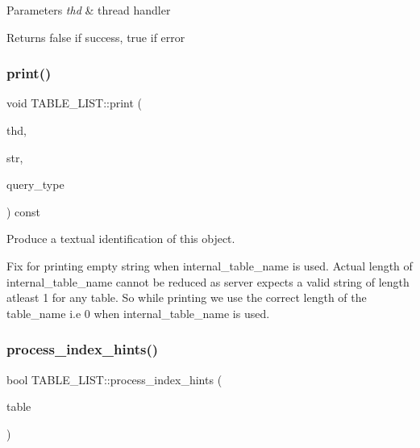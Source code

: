 \begin{DoxyParams}{Parameters}
{\em thd} & thread handler\\
\hline
\end{DoxyParams}
\begin{DoxyReturn}{Returns}
false if success, true if error 
\end{DoxyReturn}
\mbox{\label{structTABLE__LIST_a150941693e3ab1b041c7fb3dd98eb8db}} 
\subsubsection{\texorpdfstring{print()}{print()}}
{\footnotesize\ttfamily void T\+A\+B\+L\+E\+\_\+\+L\+I\+S\+T\+::print (\begin{DoxyParamCaption}\item[{T\+HD $\ast$}]{thd,  }\item[{String $\ast$}]{str,  }\item[{enum\+\_\+query\+\_\+type}]{query\+\_\+type }\end{DoxyParamCaption}) const}



Produce a textual identification of this object. 

Fix for printing empty string when internal\+\_\+table\+\_\+name is used. Actual length of internal\+\_\+table\+\_\+name cannot be reduced as server expects a valid string of length atleast 1 for any table. So while printing we use the correct length of the table\+\_\+name i.\+e 0 when internal\+\_\+table\+\_\+name is used.\mbox{\label{structTABLE__LIST_a088e2115774d6bc3dbc2d11d5db45a93}} 
\subsubsection{\texorpdfstring{process\+\_\+index\+\_\+hints()}{process\_index\_hints()}}
{\footnotesize\ttfamily bool T\+A\+B\+L\+E\+\_\+\+L\+I\+S\+T\+::process\+\_\+index\+\_\+hints (\begin{DoxyParamCaption}\item[{\mbox{\hyperlink{structTABLE}{T\+A\+B\+LE}} $\ast$}]{table }\end{DoxyParamCaption})}

